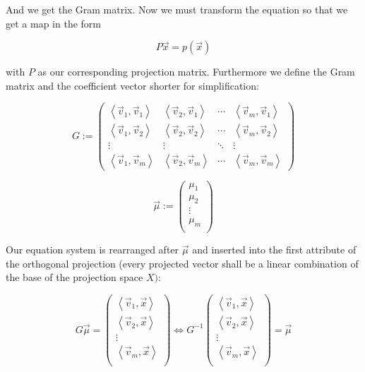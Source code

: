 \documentclass{article}
\newcommand{\lrangle}[1]{\left\langle #1 \right\rangle}
\begin{document}
And we get the Gram matrix.
Now we must transform the equation so that we get a map in the form

	\begin{equation}
		P\vec{x}=p(\vec{x})
	\end{equation}

with \(P\) as our corresponding projection matrix.
Furthermore we define the Gram matrix and the coefficient vector shorter for simplification:

	\begin{equation}
		G :=
		\begin{pmatrix}
			\lrangle{ \vec{v}_1, \vec{v}_1 } &
			\lrangle{ \vec{v}_2, \vec{v}_1 } &
			\cdots &
			\lrangle{ \vec{v}_m, \vec{v}_1 } \\
			\lrangle{ \vec{v}_1, \vec{v}_2 } &
			\lrangle{ \vec{v}_2, \vec{v}_2 } &
			\cdots &
			\lrangle{ \vec{v}_m, \vec{v}_2 } \\
			\vdots & \vdots & \ddots & \vdots \\
			\lrangle{ \vec{v}_1, \vec{v}_m } &
			\lrangle{ \vec{v}_2, \vec{v}_m } &
			\cdots &
			\lrangle{ \vec{v}_m, \vec{v}_m }
		\end{pmatrix}
	\end{equation}

	\begin{equation}
		\vec{\mu} :=
		\begin{pmatrix}
			\mu _1 \\
			\mu _2 \\
			\vdots \\
			\mu _m \\
		\end{pmatrix}
	\end{equation}

Our equation system is rearranged after \( \vec{\mu} \) and inserted into the first attribute
of the orthogonal projection (every projected vector shall be a linear combination of the base of
the projection space \(X)\):

	\begin{equation}
		G \vec{\mu} =
		\begin{pmatrix}
			\lrangle{ \vec{v}_1, \vec{x} } \\
			\lrangle{ \vec{v}_2, \vec{x} } \\
			\vdots \\
			\lrangle{ \vec{v}_m, \vec{x} } \\
		\end{pmatrix}
		\iff G^{-1}
		\begin{pmatrix}
			\lrangle{ \vec{v}_1, \vec{x} } \\
			\lrangle{ \vec{v}_2, \vec{x} } \\
			\vdots \\
			\lrangle{ \vec{v}_m, \vec{x} } \\
		\end{pmatrix} = \vec{\mu}
	\end{equation}
\end{document}

